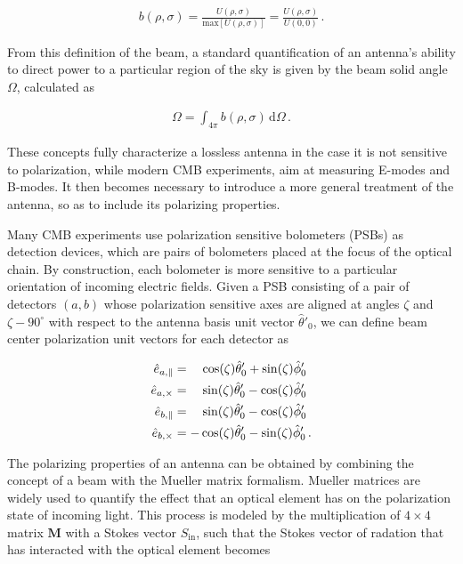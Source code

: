 \documentclass[a4paper,11pt]{article}
\newcommand{\co}{\mathbin{\|}}
\newcommand{\cx}{\mathbin{\times}}
\begin{document}
\begin{equation}
\begin{aligned}
\mathit{b}(\rho, \sigma) = \frac{ U(\rho, \sigma) }{ \mathrm{max}\left[ U(\rho,\sigma) \right] }  =  \frac{ U(\rho, \sigma) }{ U(0,0) } \, .
\end{aligned}
\label{eq::beam_def}
\end{equation}

\noindent
From this definition of the beam, a standard quantification of an antenna's ability to direct power to a particular region of the sky is given by the beam solid angle $\Omega$, calculated as

\begin{equation}
\begin{aligned}
\Omega = \int_{4\pi} \mathit{b}(\rho,\sigma) \, \mathrm{d} \Omega \, .
\end{aligned}
\label{eq::omega_def}
\end{equation}

\noindent
These concepts fully characterize a lossless antenna in the case it is not sensitive to polarization, while modern CMB experiments, aim at measuring E-modes and B-modes. It then becomes necessary to introduce a more general treatment of the antenna, so as to include its polarizing properties. 

Many CMB experiments use polarization sensitive bolometers (PSBs) as detection devices, which are pairs of bolometers placed at the focus of the optical chain. By construction, each bolometer is more sensitive to a particular orientation of incoming electric fields. Given a PSB consisting of a pair of detectors $(a,b)$ whose polarization sensitive axes are aligned at angles $\zeta$ and $\zeta - 90^{\circ}$ with respect to the antenna basis unit vector $\hat{\theta}'_0$, we can define beam center polarization unit vectors for each detector as

\begin{align}
\hat{e}_{a,{\co}}    &= \quad \cos(\zeta)\hat{\theta}'_0 + \sin(\zeta)\hat{\phi}'_0 \\
\hat{e}_{a,{\cx}}    &= \quad \sin(\zeta)\hat{\theta}'_0 - \cos(\zeta)\hat{\phi}'_0 \\
\hat{e}_{b,{\co}}    &= \quad \sin(\zeta)\hat{\theta}'_0 - \cos(\zeta)\hat{\phi}'_0 \\
\hat{e}_{b,{\cx}}    &= -\cos(\zeta)\hat{\theta}'_0 - \sin(\zeta)\hat{\phi}'_0 \, \rm{.} 
\label{eq::copol_bolo}
\end{align}

The polarizing properties of an antenna can be obtained by combining the concept of a beam with the Mueller matrix formalism. Mueller matrices are widely used to quantify the effect that an optical element has on the polarization state of incoming light. This process is modeled by the multiplication of $4\times4$ matrix $\mathbf{M}$ with a Stokes vector $S_{\mathrm{in}}$, such that the Stokes vector of radation that has interacted with the optical element becomes
\end{document}
